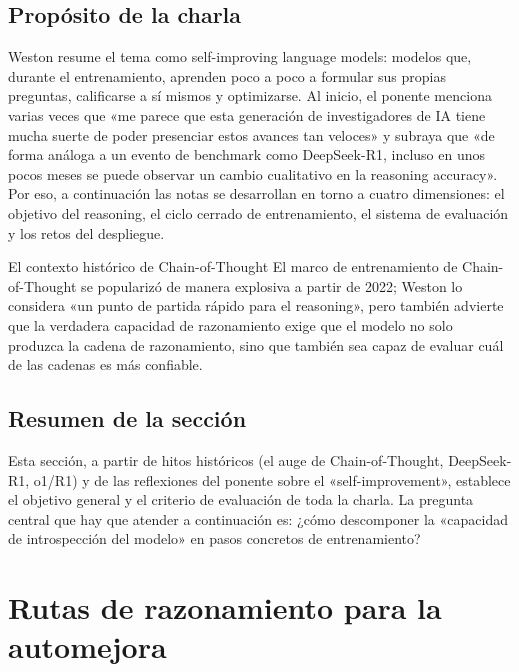 \documentclass[a4paper]{article}
\begin{document}
\subsection{Propósito de la charla}
Weston resume el tema como self-improving language models: modelos que, durante el entrenamiento, aprenden poco a poco a formular sus propias preguntas, calificarse a sí mismos y optimizarse. Al inicio, el ponente menciona varias veces que «me parece que esta generación de investigadores de IA tiene mucha suerte de poder presenciar estos avances tan veloces» y subraya que «de forma análoga a un evento de benchmark como DeepSeek-R1, incluso en unos pocos meses se puede observar un cambio cualitativo en la reasoning accuracy». Por eso, a continuación las notas se desarrollan en torno a cuatro dimensiones: el objetivo del reasoning, el ciclo cerrado de entrenamiento, el sistema de evaluación y los retos del despliegue.

\begin{knowledgebox}{El contexto histórico de Chain-of-Thought}
El marco de entrenamiento de Chain-of-Thought se popularizó de manera explosiva a partir de 2022; Weston lo considera «un punto de partida rápido para el reasoning», pero también advierte que la verdadera capacidad de razonamiento exige que el modelo no solo produzca la cadena de razonamiento, sino que también sea capaz de evaluar cuál de las cadenas es más confiable.
\end{knowledgebox}

\subsection{Resumen de la sección}
Esta sección, a partir de hitos históricos (el auge de Chain-of-Thought, DeepSeek-R1, o1/R1) y de las reflexiones del ponente sobre el «self-improvement», establece el objetivo general y el criterio de evaluación de toda la charla. La pregunta central que hay que atender a continuación es: ¿cómo descomponer la «capacidad de introspección del modelo» en pasos concretos de entrenamiento?
\section{Rutas de razonamiento para la automejora}
\end{document}

